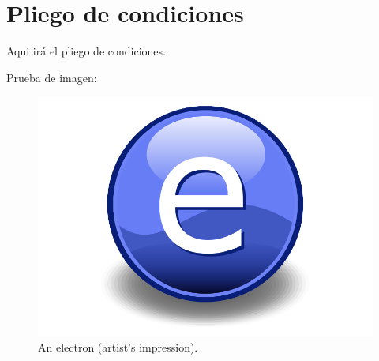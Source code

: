 
\chapter{Pliego de condiciones} %

\label{Pliego} %

Aqui irá el pliego de condiciones.
 
Prueba de imagen: 

\begin{figure}[th]
\centering
\includegraphics{Figuras/Electron}
\decoRule
\caption[An Electron]{An electron (artist's impression).}
\label{fig:Electron}
\end{figure}

